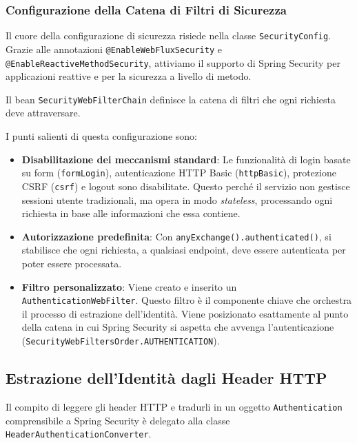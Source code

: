 \subsubsection{Configurazione della Catena di Filtri di Sicurezza}

Il cuore della configurazione di sicurezza risiede nella classe \texttt{SecurityConfig}.
Grazie alle annotazioni \texttt{@EnableWebFluxSecurity} e \texttt{@EnableReactiveMethodSecurity}, attiviamo il supporto di Spring Security per applicazioni reattive e per la sicurezza a livello di metodo.

Il bean \texttt{SecurityWebFilterChain} definisce la catena di filtri che ogni richiesta deve attraversare.



I punti salienti di questa configurazione sono:
\begin{itemize}
    \item \textbf{Disabilitazione dei meccanismi standard}: Le funzionalità di login basate su form (\texttt{formLogin}), autenticazione HTTP Basic (\texttt{httpBasic}), protezione CSRF (\texttt{csrf}) e logout sono disabilitate. Questo perché il servizio non gestisce sessioni utente tradizionali, ma opera in modo \textit{stateless}, processando ogni richiesta in base alle informazioni che essa contiene.
    \item \textbf{Autorizzazione predefinita}: Con \texttt{anyExchange().authenticated()}, si stabilisce che ogni richiesta, a qualsiasi endpoint, deve essere autenticata per poter essere processata.
    \item \textbf{Filtro personalizzato}: Viene creato e inserito un \texttt{AuthenticationWebFilter}. Questo filtro è il componente chiave che orchestra il processo di estrazione dell'identità. Viene posizionato esattamente al punto della catena in cui Spring Security si aspetta che avvenga l'autenticazione (\texttt{SecurityWebFiltersOrder.AUTHENTICATION}).
\end{itemize}

\subsection{Estrazione dell'Identità dagli Header HTTP}
Il compito di leggere gli header HTTP e tradurli in un oggetto \texttt{Authentication} comprensibile a Spring Security è delegato alla classe \texttt{HeaderAuthenticationConverter}.


